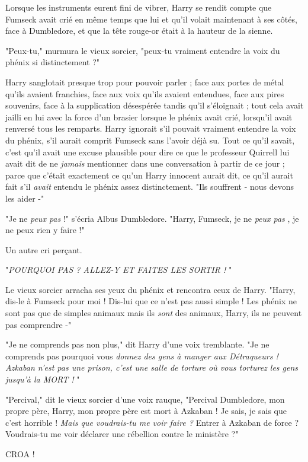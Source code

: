 Lorsque les instruments eurent fini de vibrer, Harry se rendit compte que Fumseck avait crié en même temps que lui et qu'il volait maintenant à ses côtés, face à Dumbledore, et que la tête rouge-or était à la hauteur de la sienne.

"Peux-tu," murmura le vieux sorcier, "peux-tu vraiment entendre la voix du phénix si distinctement ?"

Harry sanglotait presque trop pour pouvoir parler ; face aux portes de métal qu'ils avaient franchies, face aux voix qu'ils avaient entendues, face aux pires souvenirs, face à la supplication désespérée tandis qu'il s'éloignait ; tout cela avait jailli en lui avec la force d'un brasier lorsque le phénix avait crié, lorsqu'il avait renversé tous les remparts. Harry ignorait s'il pouvait vraiment entendre la voix du phénix, s'il aurait comprit Fumseck sans l'avoir déjà su. Tout ce qu'il savait, c'est qu'il avait une excuse plausible pour dire ce que le professeur Quirrell lui avait dit de ne \emph{jamais}  mentionner dans une conversation à partir de ce jour ; parce que c'était exactement ce qu'un Harry innocent aurait dit, ce qu'il aurait fait s'il \emph{avait}  entendu le phénix assez distinctement. "Ils souffrent - nous devons les aider -"

"Je ne \emph{peux pas}  !" s'écria Albus Dumbledore. "Harry, Fumseck, je ne \emph{peux pas} , je ne peux rien y faire !"

Un autre cri perçant.

"\emph{POURQUOI PAS ? ALLEZ-Y ET FAITES LES SORTIR !} "

Le vieux sorcier arracha ses yeux du phénix et rencontra ceux de Harry. "Harry, dis-le à Fumseck pour moi ! Dis-lui que ce n'est pas aussi simple ! Les phénix ne sont pas que de simples animaux mais ils \emph{sont}  des animaux, Harry, ils ne peuvent pas comprendre -"

"Je ne comprends pas non plus," dit Harry d'une voix tremblante. "Je ne comprends pas pourquoi vous \emph{donnez des gens à manger aux Détraqueurs ! Azkaban n'est pas une prison, c'est une salle de torture où vous torturez les gens jusqu'à la MORT !} "

"Percival," dit le vieux sorcier d'une voix rauque, "Percival Dumbledore, mon propre père, Harry, mon propre père est mort à Azkaban ! Je sais, je sais que c'est horrible ! \emph{Mais que voudrais-tu me voir faire ?}  Entrer à Azkaban de force ? Voudrais-tu me voir déclarer une rébellion contre le ministère ?"

CROA !

